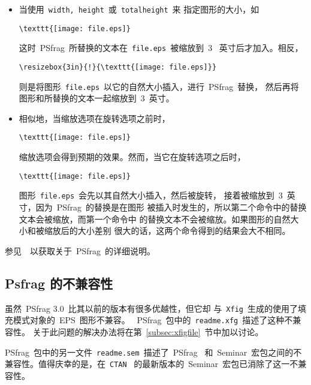 \begin{itemize}
\item 当使用~\texttt{width, height}~或~\texttt{totalheight}~来
      指定图形的大小，如
      \begin{Verbatim}[xleftmargin=1cm]
      \texttt{[image: file.eps]}
      \end{Verbatim}
      这时~\textsf{PSfrag}~所替换的文本在~\texttt{file.eps}~被缩放到~3~
      英寸后才加入。相反，
      \begin{Verbatim}[xleftmargin=1cm]
      \resizebox{3in}{!}{\texttt{[image: file.eps]}}
      \end{Verbatim}
      则是将图形~\texttt{file.eps}~以它的自然大小插入，进行~\textsf{PSfrag}~替换，
      然后再将图形和所替换的文本一起缩放到~3~英寸。
\item 相似地，当缩放选项在旋转选项之前时，
      \begin{Verbatim}[xleftmargin=1cm]
      \texttt{[image: file.eps]}
      \end{Verbatim}
      缩放选项会得到预期的效果。然而，当它在旋转选项之后时，
      \begin{Verbatim}[xleftmargin=1cm]
      \texttt{[image: file.eps]}
      \end{Verbatim}
      图形~\texttt{file.eps}~会先以其自然大小插入，然后被旋转，
      接着被缩放到~3~英寸，因为~\textsf{PSfrag}~的替换是在图形
      被插入时发生的，所以第二个命令中的替换文本会被缩放，而第一个命令中
      的替换文本不会被缩放。如果图形的自然大小和被缩放后的大小差别
      很大的话，这两个命令得到的结果会大不相同。
\end{itemize}

参见~\cite{psfrag}~以获取关于~\textsf{PSfrag}~的详细说明。

\clearpage

\subsection{Psfrag 的不兼容性}\label{ssec:psfragcomp}

虽然~\textsf{PSfrag 3.0}~比其以前的版本有很多优越性，但它却
与~\texttt{Xfig}~生成的使用了填充模式对象的~EPS~图形不兼容。
~\textsf{PSfrag}~包中的~\texttt{readme.xfg}~描述了这种不兼容性。
关于此问题的解决办法将在第~\ref{subsec:xfigfile}~节中加以讨论。

\textsf{PSfrag}~包中的另一文件~\texttt{readme.sem}~描述了~\textsf{PSfrag}~
和~\textsf{Seminar}~宏包之间的不兼容性。值得庆幸的是，在~\texttt{CTAN}~
的最新版本的~\textsf{Seminar}~宏包已消除了这一不兼容性。

